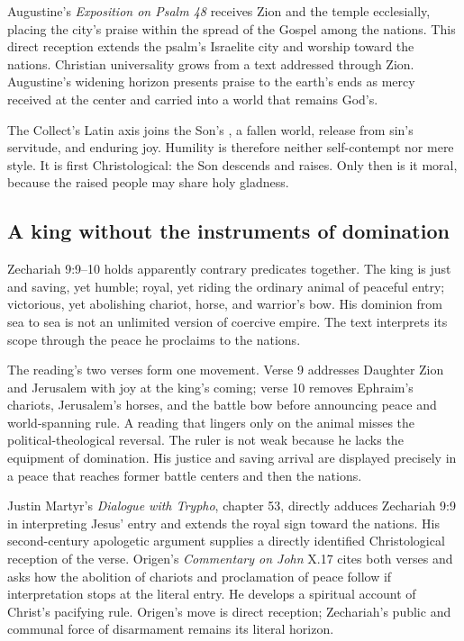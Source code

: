 \begin{deepstudy}
Augustine's \emph{Exposition on Psalm 48} receives Zion and the temple ecclesially, placing the city's praise within the spread of the Gospel among the nations. This direct reception extends the psalm's Israelite city and worship toward the nations. Christian universality grows from a text addressed through Zion. Augustine's widening horizon presents praise to the earth's ends as mercy received at the center and carried into a world that remains God's.

The Collect's Latin axis joins the Son's , a fallen world, release from sin's servitude, and enduring joy. Humility is therefore neither self-contempt nor mere style. It is first Christological: the Son descends and raises. Only then is it moral, because the raised people may share holy gladness.

\subsection*{A king without the instruments of domination\enspace{}}

Zechariah 9:9--10 holds apparently contrary predicates together. The king is just and saving, yet humble; royal, yet riding the ordinary animal of peaceful entry; victorious, yet abolishing chariot, horse, and warrior's bow. His dominion from sea to sea is not an unlimited version of coercive empire. The text interprets its scope through the peace he proclaims to the nations.

The reading's two verses form one movement. Verse 9 addresses Daughter Zion and Jerusalem with joy at the king's coming; verse 10 removes Ephraim's chariots, Jerusalem's horses, and the battle bow before announcing peace and world-spanning rule. A reading that lingers only on the animal misses the political-theological reversal. The ruler is not weak because he lacks the equipment of domination. His justice and saving arrival are displayed precisely in a peace that reaches former battle centers and then the nations.

Justin Martyr's \emph{Dialogue with Trypho}, chapter 53, directly adduces Zechariah 9:9 in interpreting Jesus' entry and extends the royal sign toward the nations. His second-century apologetic argument supplies a directly identified Christological reception of the verse. Origen's \emph{Commentary on John} X.17 cites both verses and asks how the abolition of chariots and proclamation of peace follow if interpretation stops at the literal entry. He develops a spiritual account of Christ's pacifying rule. Origen's move is direct reception; Zechariah's public and communal force of disarmament remains its literal horizon.


\end{deepstudy}
